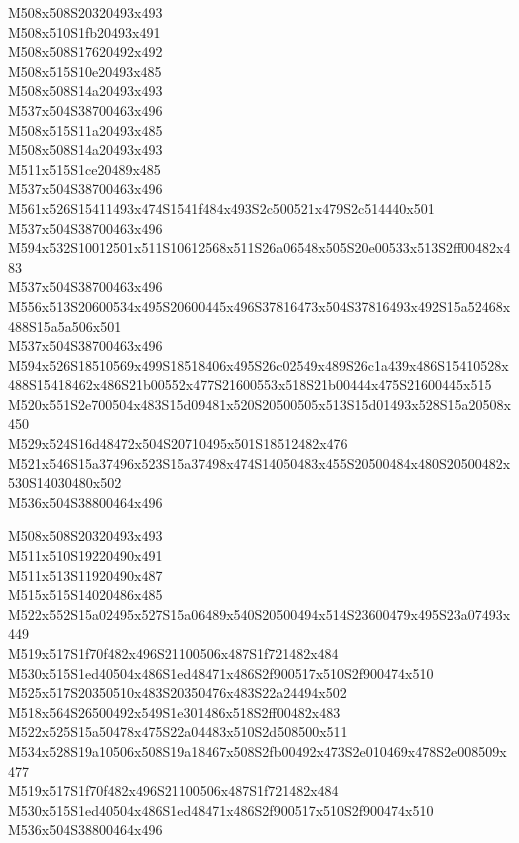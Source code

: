 \documentclass{article}
\begin{document}
\begin{multicols}{5}
\begin{center}
M508x508S20320493x493 %
\\M508x510S1fb20493x491 %
\\M508x508S17620492x492 %
\\M508x515S10e20493x485 %
\\M508x508S14a20493x493 %
\\M537x504S38700463x496 %
\\M508x515S11a20493x485 %
\\M508x508S14a20493x493 %
\\M511x515S1ce20489x485 %
\\M537x504S38700463x496 %
\\M561x526S15411493x474S1541f484x493S2c500521x479S2c514440x501 %
\\M537x504S38700463x496 %
\\M594x532S10012501x511S10612568x511S26a06548x505S20e00533x513S2ff00482x483 %
\\M537x504S38700463x496 %
\\M556x513S20600534x495S20600445x496S37816473x504S37816493x492S15a52468x488S15a5a506x501 %
\\M537x504S38700463x496 %
\\M594x526S18510569x499S18518406x495S26c02549x489S26c1a439x486S15410528x488S15418462x486S21b00552x477S21600553x518S21b00444x475S21600445x515 %
\\M520x551S2e700504x483S15d09481x520S20500505x513S15d01493x528S15a20508x450 %
\\M529x524S16d48472x504S20710495x501S18512482x476 %
\\M521x546S15a37496x523S15a37498x474S14050483x455S20500484x480S20500482x530S14030480x502 %
\\M536x504S38800464x496 %

M508x508S20320493x493 %
\\M511x510S19220490x491 %
\\M511x513S11920490x487 %
\\M515x515S14020486x485 %
\\M522x552S15a02495x527S15a06489x540S20500494x514S23600479x495S23a07493x449 %
\\M519x517S1f70f482x496S21100506x487S1f721482x484 %
\\M530x515S1ed40504x486S1ed48471x486S2f900517x510S2f900474x510 %
\\M525x517S20350510x483S20350476x483S22a24494x502 %
\\M518x564S26500492x549S1e301486x518S2ff00482x483 %
\\M522x525S15a50478x475S22a04483x510S2d508500x511 %
\\M534x528S19a10506x508S19a18467x508S2fb00492x473S2e010469x478S2e008509x477 %
\\M519x517S1f70f482x496S21100506x487S1f721482x484 %
\\M530x515S1ed40504x486S1ed48471x486S2f900517x510S2f900474x510 %
\\M536x504S38800464x496 %


\end{center}
\end{multicols}
\end{document}
